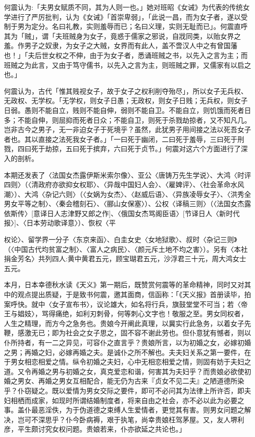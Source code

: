 何震认为:「夫男女赋质不同，其为人则一也。」她对班昭《女诫》为代表的传统女学进行了严厉批判，认为《女诫》「首崇卑弱」，「此说一昌，而为女子者，遂以受制于男为定分。名曰礼教，实则羞辱而已；名曰义理，实则无耻而已」。何震直呼其为「贼」，谓「夫班贼身为女子，竟惑于儒家之邪说，自戕同类，以贻女界之羞。作男子之奴隶，为女子之大贼，女界而有此人，盖不啻汉人中之有曾国藩也！」「夫后世女权之不伸，由于为女子者，悉诵班贼之书，以先入之言为主；而班贼之为此言，又由于笃守儒书，以先入之言为主，则班贼之罪，又儒家有以启之也。」

何震认为，古代「惟其贱视女子，故于女子之权利削夺殆尽」，所以女子无兵权、无政权、无学权。「无学权，则女子日愚；无政权，则女子日贱；无兵权，则女子日弱。愚则不能自立，贱则不能自伸，弱则不能自卫。不能自立，则饥饿而死者日多；不能自伸，则屈抑而死者日众；不能自卫，则死于杀戮劫掠者，又不知凡几。岂非古今之男子，无一非迫女子于死境乎？虽然，此犹男子用间接之法以死吾女子者也。其以直接之法死我女子者。」「一曰死于幽闭，二曰死于羞辱，三曰死于刑戮，四曰死于劫掠，五曰死于摈弃，六曰死于贞节。」何震对这六个方面进行了深入的剖析。

本期还发表了〈法国女杰露伊斯米索尔像〉、亚公〈唐铸万先生学说〉、大鸿〈时评四则〉（〈清政府亦欲抑女权耶〉、〈异哉中国妇人会〉、〈雇婢评〉、〈社会革命水风潮〉）、大鸿〈杂记六则〉（〈女娲为女杰〉、〈赵威后语〉、〈异族凌辱女子〉、〈洪秀全男女平等之制〉、〈秦会稽刻石〉、〈郦山女保塞〉）、公权〈译稿三则〉（〈法国女杰露依斯传〉[意译日人志津野又郎之作]、〈俄国女杰骂阁臣语〉[节译日人〈新时代报〉]、〈日本劳动歌译意〉）、恢权〈平


\noindent 权论〉、留学界一分子〈东京来函〉、白圭女史〈女地狱歌〉、叔时〈杂记三则》（〈中国古代均贫富之制〉、〈富人之病民〉、〈颜元斥土地不均之害〉）。另有〈本社捐金芳名〉共列四人:黄中黄君五元，顾宝瑚君五元，沙浮君三十元，周大鸿女士五元。

本月，日本幸德秋水读《天义》第一期后，既赞赏何震等的革命精神，同时又对其中的观点提出质疑，于是致书何震，邀其面商，信函称：「《天义报》首册读毕，拍案呼快。就中〈女子宣布书〉，议论雄大，如名将行兵，旗鼓堂堂不可当；若〈帝王与娼妓〉，骂得痛绝，如利刃刺骨，何等刺心文字也！敬服之至。男女同权者，人生之精理，而方今之急务也。贵娘今开阐此真理，以冀实行此急务，以着女子先鞭，感激无已；即为社会之女子思之，固不容不谢此劳也。但仆意犹有憾者，则以仆所持者，有一二之异见，可容仆之直言乎？贵娘所言，以为初婚之女，必嫁初婚之男；再婚之妇，必嫁再婚之夫。是诚仆之所不解也。夫夫妇关系之第一要件，在于男女相恋相爱之情。纵令初婚之夫妇，心中无相恋相爱之情，则固有妨于夫妇之道。又令再婚之男与初婚之女，真克爱恋和谐，何害其为夫妇乎？而贵娘必欲使初婚之男女、再婚之男女互相配合，能无仍为古来『贞女不见二夫』之陋道德所染乎？仆窃疑之。既以爱情为男女交际之要件，即可不必问其为法律上所许否，即夫妇相栖而成家，如现时所谓结婚制度者，将来自由之社会，亦不必以此为必要之事。盖仆最恶淫佚，为于伪道德之束缚人生爱情者，更觉其有害。则男女问题之解决，岂可不深思乎？仆今卧病褥，艰于执笔，尚幸贵娘枉驾茅屋。又，友人堺利彦，平生颇讨究女权问题。贵娘若来，仆亦欲延之共论也。」

